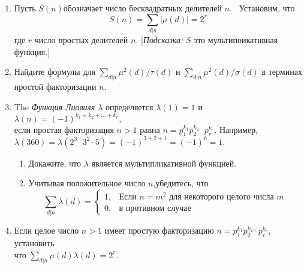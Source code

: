 \documentclass[11pt]{article}
\begin{document}
\begin{enumerate}
\item Пусть $S(n)$обозначает число бесквадратных делителей $n$.~ Установим, что\\
$$S(n)=\sum_{d|n}|\mu(d)|=2^r$$
где $r$ число простых делителей $n$. [{\itshape Подсказка:} $S$ это мультипоикативная функция.] 
\item Найдите формулы для 
$\sum_{d|n}\mu^2(d)/\tau(d)$ и
$\sum_{d|n}\mu^2(d)/\sigma(d)$ в терминах простой факторизации  $n$.
\item The {\it Функция Лиовиля $\lambda$} определяется $\lambda(1)=1$ и $\lambda(n)=(-1)^{k_1+k_2+\dots+k_r},$\\
если простая факторизация $n>1$ равна $n=p_1^{k_1}p_2^{k_2\dots}p_r^{k_r}.$ Например,\\
$\lambda(360)=\lambda(2^3 \cdot 3^2 \cdot5)=(-1)^{3+2+1}=(-1)^6=1.$
\begin{enumerate}
\item Докажите, что $\lambda$ является мультипликативной функцией.
\item Учитывая положительное число $n$,убедитесь, что\\
$$\sum_{d|n}\lambda(d)=\begin{cases}
1,&\text{Если $n=m^2$ для некоторого целого числа $m$}\\
0,&\text{в противном случае}
\end{cases} $$
\end{enumerate}
\item Если целое число $n>1$ имеет простую факторизацию $n=p_1^{k_1}p_2^{k_2\dots}p_r^{k_r}$, установить\\
что $\sum_{d|n}\mu(d)\lambda(d)=2^r.$
	
	
	
	
	
	
	
	
	
	
	
	
\end{enumerate}	
\end{document}

